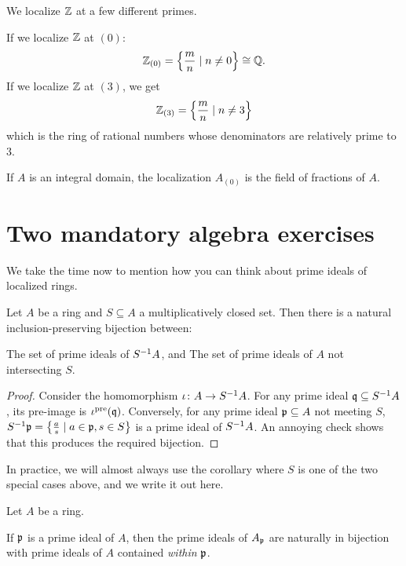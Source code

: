 \begin{example}
	We localize $\mathbb Z$ at a few different primes.
	\begin{enumerate}[(a)]
		\ii If we localize $\mathbb Z$ at $(0)$:
		\[ \mathbb Z_{(0)} = \left\{ \frac mn \mid n \ne 0 \right\}
			\cong \mathbb Q. \]
		\ii If we localize $\mathbb Z$ at $(3)$, we get
		\[ \mathbb Z_{(3)} = \left\{ \frac mn \mid n \ne 3 \right\} \]
		which is the ring of rational numbers
		whose denominators are relatively prime to $3$.
	\end{enumerate}
\end{example}

\begin{example}
	If $A$ is an integral domain,
	the localization $A_{(0)}$
	is the field of fractions of $A$.
\end{example}


\section{Two mandatory algebra exercises}
We take the time now to mention how you can
think about prime ideals of localized rings.
\begin{proposition}
	Let $A$ be a ring and $S \subseteq A$ a multiplicatively closed set.
	Then there is a natural inclusion-preserving bijection between:
	\begin{itemize}
		\ii The set of prime ideals of $S^{-1} A$, and
		\ii The set of prime ideals of $A$ not intersecting $S$.
	\end{itemize}
\end{proposition}
\begin{proof}
	Consider the homomorphism $\iota \colon A \to S^{-1} A$.
	For any prime ideal $\mathfrak q \subseteq S^{-1} A$,
	its pre-image is $\iota^{\text{pre}}(\mathfrak q)$.
	Conversely, for any prime ideal $\mathfrak p \subseteq A$
	not meeting $S$,
	$S^{-1} \mathfrak p = \left\{ \frac{a}{s} \mid a \in \mathfrak p, s \in S \right\}$
	is a prime ideal of $S^{-1} A$.
	An annoying check shows that this produces the required bijection.
\end{proof}
In practice, we will almost always use the corollary
where $S$ is one of the two special cases above,
and we write it out here.
\begin{corollary}
	Let $A$ be a ring.
	\begin{enumerate}[(a)]
		\ii If $\mathfrak p$ is a prime ideal of $A$,
		then the prime ideals of $A_\mathfrak p$ are naturally
		in bijection with prime ideals of $A$ contained \emph{within} $\mathfrak p$.
	\end{enumerate}
\end{corollary}


